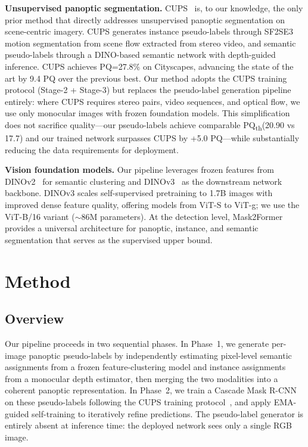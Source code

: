 \documentclass{bmvc2k}
\newcommand{\pqt}{PQ\textsubscript{th}\xspace}
\begin{document}
\noindent\textbf{Unsupervised panoptic segmentation.}
CUPS~\cite{hahn2025cups} is, to our knowledge, the only prior method that directly addresses unsupervised panoptic segmentation on scene-centric imagery. CUPS generates instance pseudo-labels through SF2SE3 motion segmentation from scene flow extracted from stereo video, and semantic pseudo-labels through a DINO-based semantic network with depth-guided inference. CUPS achieves PQ=27.8\% on Cityscapes, advancing the state of the art by 9.4 PQ over the previous best. Our method adopts the CUPS training protocol (Stage-2 + Stage-3) but replaces the pseudo-label generation pipeline entirely: where CUPS requires stereo pairs, video sequences, and optical flow, we use only monocular images with frozen foundation models. This simplification does not sacrifice quality---our pseudo-labels achieve comparable \pqt (20.90 vs 17.7) and our trained network surpasses CUPS by +5.0 PQ---while substantially reducing the data requirements for deployment.

\noindent\textbf{Vision foundation models.}
Our pipeline leverages frozen features from DINOv2~\cite{oquab2024dinov2} for semantic clustering and DINOv3~\cite{fang2025dinov3} as the downstream network backbone. DINOv3 scales self-supervised pretraining to 1.7B images with improved dense feature quality, offering models from ViT-S to ViT-g; we use the ViT-B/16 variant ($\sim$86M parameters). At the detection level, Mask2Former~\cite{cheng2022mask2former} provides a universal architecture for panoptic, instance, and semantic segmentation that serves as the supervised upper bound.

\section{Method}
\label{sec:method}

\subsection{Overview}

Our pipeline proceeds in two sequential phases. In Phase~1, we generate per-image panoptic pseudo-labels by independently estimating pixel-level semantic assignments from a frozen feature-clustering model and instance assignments from a monocular depth estimator, then merging the two modalities into a coherent panoptic representation. In Phase~2, we train a Cascade Mask R-CNN~\cite{cai2021cascade} on these pseudo-labels following the CUPS training protocol~\cite{hahn2025cups}, and apply EMA-guided self-training to iteratively refine predictions. The pseudo-label generator is entirely absent at inference time: the deployed network sees only a single RGB image.
\end{document}
